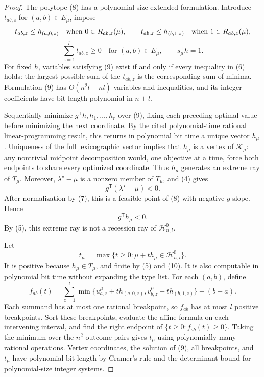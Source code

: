 \documentclass{article}
\begin{document}
\begin{proof}
The polytope (8) has a polynomial-size extended formulation. Introduce \(t_{ab,z}\) for \((a,b)\in E_\mu\), impose
\[
\makebox[\linewidth][c]{\resizebox{0.98\linewidth}{!}{\par\noindent \makebox[\linewidth][c]{\resizebox{0.98\linewidth}{!}{\(\displaystyle \displaystyle t_{ab,z}\le h_{(a,0,z)}\quad\text{when }0\in R_{ab,z}(\mu),\qquad t_{ab,z}\le h_{(b,1,z)}\quad\text{when }1\in R_{ab,z}(\mu),\)}}\par\noindent}}
\]
\[\sum_{z=1}^lt_{ab,z}\ge0\quad\text{for }(a,b)\in E_\mu,\qquad s_\mu^{\mathsf T}h=1.\tag{9}\]
For fixed \(h\), variables satisfying (9) exist if and only if every inequality in (6) holds: the largest possible sum of the \(t_{ab,z}\) is the corresponding sum of minima. Formulation (9) has \(O(n^2l+nl)\) variables and inequalities, and its integer coefficients have bit length polynomial in \(n+l\).

Sequentially minimize \(g^{\mathsf T}h,h_1,\ldots,h_r\) over (9), fixing each preceding optimal value before minimizing the next coordinate. By the cited polynomial-time rational linear-programming result, this returns in polynomial bit time a unique vector \(h_\mu\). Uniqueness of the full lexicographic vector implies that \(h_\mu\) is a vertex of \(\mathcal K_\mu\): any nontrivial midpoint decomposition would, one objective at a time, force both endpoints to share every optimized coordinate. Thus \(h_\mu\) generates an extreme ray of \(T_\mu\). Moreover, \(\lambda^\star-\mu\) is a nonzero member of \(T_\mu\), and (4) gives
\[g^{\mathsf T}(\lambda^\star-\mu)<0.\]
After normalization by (7), this is a feasible point of (8) with negative \(g\)-slope. Hence
\[g^{\mathsf T}h_\mu<0.\tag{10}\]
By (5), this extreme ray is not a recession ray of \(\mathcal H^0_{n,l}\).

Let
\[t_\mu=\max\{t\ge0:\mu+t h_\mu\in\mathcal H^0_{n,l}\}.\]
It is positive because \(h_\mu\in T_\mu\), and finite by (5) and (10). It is also computable in polynomial bit time without expanding the type list. For each \((a,b)\), define
\[f_{ab}(t)=\sum_{z=1}^l\min\{u^\mu_{a,z}+t h_{(a,0,z)},v^\mu_{b,z}+t h_{(b,1,z)}\}-(b-a).\]
Each summand has at most one rational breakpoint, so \(f_{ab}\) has at most \(l\) positive breakpoints. Sort these breakpoints, evaluate the affine formula on each intervening interval, and find the right endpoint of \(\{t\ge0:f_{ab}(t)\ge0\}\). Taking the minimum over the \(n^2\) outcome pairs gives \(t_\mu\) using polynomially many rational operations. Vertex coordinates, the solution of (9), all breakpoints, and \(t_\mu\) have polynomial bit length by Cramer's rule and the determinant bound for polynomial-size integer systems.


\end{proof}
\end{document}
